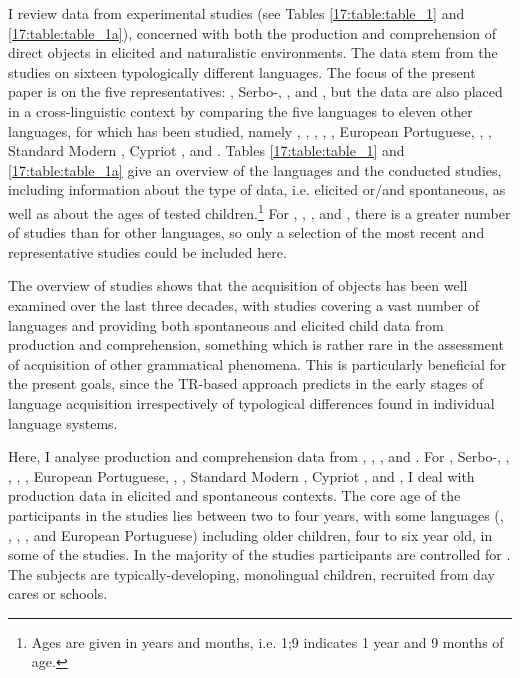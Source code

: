 \documentclass[output=paper,modfonts,newtxmath,hidelinks,]{langscibook}
\begin{document}
I review data from experimental studies (see Tables \ref{17:table:table_1} and \ref{17:table:table_1a}), concerned with both the production and comprehension of direct objects in elicited and naturalistic environments. The data stem from the studies on sixteen typologically different languages. The focus of the present paper is on the five  representatives: , Serbo-, ,  and , but the data are also placed in a cross-linguistic context by comparing the five  languages to eleven other languages, for which  has been studied, namely , , , , , European Portuguese, , , Standard Modern , Cypriot , and . Tables \ref{17:table:table_1} and \ref{17:table:table_1a} give an overview of the languages and the conducted studies, including information about the type of data, i.e. elicited or/and spontaneous, as well as about the ages of tested children.\footnote{\label{17:fn3}Ages are given in years and months, i.e. 1;9 indicates 1 year and 9 months of age.} For , , , and , there is a greater number of studies than for other languages, so only a selection of the most recent and representative studies could be included here.

The overview of studies shows that the acquisition of objects has been well examined over the last three decades, with studies covering a vast number of languages and providing both spontaneous and elicited child data from production and comprehension, something which is rather rare in the assessment of acquisition of other grammatical phenomena. This is particularly beneficial for the present goals, since the TR-based approach predicts  in the early stages of language acquisition irrespectively of typological differences found in individual language systems.\largerpage[-2]

Here, I analyse production and comprehension data from , , , and . For , Serbo-, , , , , European Portuguese, , , Standard Modern , Cypriot , and , I deal with production data in elicited and spontaneous contexts. The core age of the participants in the studies lies between two to four years, with some languages (, , , , and European Portuguese) including older children, four to six year old, in some of the studies. In the majority of the studies participants are controlled for . The subjects are typically-developing, monolingual children, recruited from day cares or schools.
\end{document}
